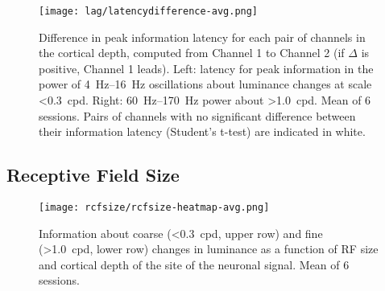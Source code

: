 \begin{figure}[htb]
    \centering
    \texttt{[image: lag/latencydifference-avg.png]}
    \caption{
Difference in peak information latency for each pair of channels in the cortical depth, computed from Channel 1 to Channel 2 (if $\Delta$ is positive, Channel 1 leads).
Left: latency for peak information in the power of \SIrange{4}{16}{Hz} oscillations about luminance changes at scale \SI{<0.3}{cpd}.
Right: \SIrange{60}{170}{Hz} power about \SI{>1.0}{cpd}.
Mean of 6 sessions.
Pairs of channels with no significant difference between their information latency (Student's t-test) are indicated in white.
}
\label{fig:lam_lag_dif}
\end{figure}

\subsection{Receptive Field Size}


%
%
%
%
%


\begin{figure}[htb]
    \centering
    \texttt{[image: rcfsize/rcfsize-heatmap-avg.png]}
    \caption{
Information about coarse (\SI{<0.3}{cpd}, upper row) and fine (\SI{>1.0}{cpd}, lower row) changes in luminance as a function of \ac{RF} size and cortical depth of the site of the neuronal signal.
Mean of 6 sessions.
}
\label{fig:lam_rcfsize_hm}
\end{figure}

